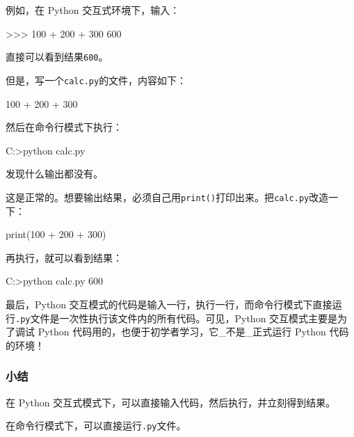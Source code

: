 例如，在 Python 交互式环境下，输入：

\begin{pythoncode}
>>> 100 + 200 + 300
600
\end{pythoncode}

直接可以看到结果\texttt{600}。

但是，写一个\texttt{calc.py}的文件，内容如下：

\begin{pythoncode}
100 + 200 + 300
\end{pythoncode}

然后在命令行模式下执行：

\begin{pythoncode}
C:\work>python calc.py
\end{pythoncode}

发现什么输出都没有。

这是正常的。想要输出结果，必须自己用\texttt{print()}打印出来。把\texttt{calc.py}改造一下：

\begin{pythoncode}
print(100 + 200 + 300)
\end{pythoncode}

再执行，就可以看到结果：

\begin{pythoncode}
C:\work>python calc.py
600
\end{pythoncode}

最后，Python
交互模式的代码是输入一行，执行一行，而命令行模式下直接运行\texttt{.py}文件是一次性执行该文件内的所有代码。可见，Python
交互模式主要是为了调试 Python
代码用的，也便于初学者学习，它\_不是\_正式运行 Python 代码的环境！

\hypertarget{ux5c0fux7ed3}{%
\subsubsection{小结}\label{ux5c0fux7ed3}}

在 Python 交互式模式下，可以直接输入代码，然后执行，并立刻得到结果。

在命令行模式下，可以直接运行\texttt{.py}文件。

